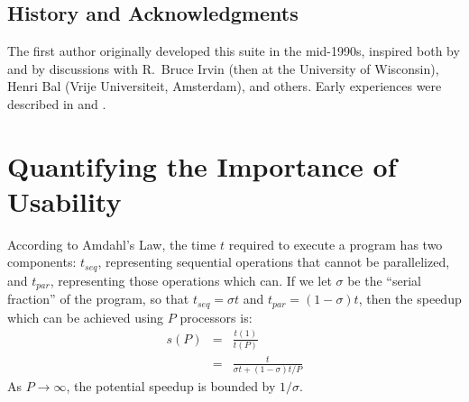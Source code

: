 \subsection*{History and Acknowledgments}

The first author originally developed this suite in the mid-1990s,
inspired both by \cite{b:salishan} and by
discussions with R.\ Bruce Irvin (then at the University of Wisconsin),
Henri Bal (Vrije Universiteit, Amsterdam),
and others.
Early experiences were described in \cite{b:cowichan-ifip} and \cite{b:cowichan-orca}.

\section{Quantifying the Importance of Usability\label{s:corollary}}

According to Amdahl's Law,
the time $t$ required to execute a program has two components:
$t_{seq}$, representing sequential operations that cannot be parallelized,
and $t_{par}$, representing those operations which can.
If we let $\sigma$ be the ``serial fraction'' of the program,
so that $t_{seq} = {\sigma}t$ and $t_{par} = (1-{\sigma})t$,
then the speedup which can be achieved using $P$ processors is:
\begin{eqnarray*}
s(P)	& =	& \frac{t(1)}{t(P)}	\\
	& =	& \frac{t}{{{\sigma}t} + {{(1-{\sigma})t}}/{P}}
\end{eqnarray*}
As $P{\rightarrow}{\infty}$,
the potential speedup is bounded by $1/{\sigma}$.

